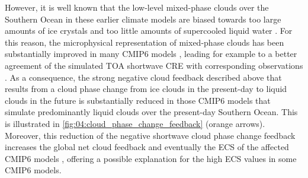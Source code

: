 However, it is well known that the low-level mixed-phase clouds over the
Southern Ocean in these earlier climate models are biased towards too large
amounts of ice crystals and too little amounts of supercooled liquid water
\autocite{BodasSalcedo2016, McCoy2015, McCoy2016, Tan2016}. For this reason,
the microphysical representation of mixed-phase clouds has been substantially
improved in many \acs{CMIP}6 models \autocite{BodasSalcedo2019, Gettelman2019,
  Mulcahy2020, Williams2020}, leading for example to a better agreement of the
simulated \ac{TOA} shortwave \ac{CRE} with corresponding observations
\autocite{Bock2020}. As a consequence, the strong negative cloud feedback
described above that results from a cloud phase change from ice clouds in the
present-day to liquid clouds in the future is substantially reduced in those
\acs{CMIP}6 models that simulate predominantly liquid clouds over the
present-day Southern Ocean. This is illustrated in
\cref{fig:04:cloud_phase_change_feedback} (orange arrows). Moreover, this
reduction of the negative shortwave cloud phase change feedback increases the
global net cloud feedback \autocite{BodasSalcedo2019, Tan2016} and eventually
the \ac{ECS} of the affected \acs{CMIP}6 models \autocite{Andrews2019,
  Gettelman2019}, offering a possible explanation for the high \ac{ECS} values in
some \acs{CMIP}6 models.

